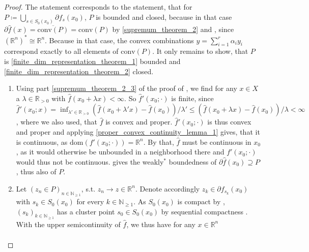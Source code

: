 \documentclass[10pt, leqno]{amsart}
\theoremstyle{definition}
\theoremstyle{remark}
\newcommand{\draftcommentdone}{}
\begin{document}
    \begin{proof}
        The statement corresponds to the statement, that for \(P \coloneqq \bigcup_{s \in S_0(x_0)} \partial f_s(x_0)\), \(P\) is bounded and closed, because in that case \(\partial \hat{f}(x) = \overline{\text{conv}(P)} = \text{conv}(P)\) by  \ref{supremum_theorem_2} and , since \((\mathbb{R}^n)^* \cong \mathbb{R}^n\). Because in that case, the convex combinations \(y = \sum_{i=1}^r \alpha_i y_i\) correspond exactly to all elements of \(\text{conv}(P)\). It only remains to show, that \(P\) is \ref{finite_dim_representation_theorem_1} bounded and \ref{finite_dim_representation_theorem_2} closed.

        \begin{enumerate}[label=(\alph*), wide]
            \item \label{finite_dim_representation_theorem_1} \draftcommentdone Using part \ref{supremum_theorem_2_3} of the proof of , we find for any \(x \in X\) a \(\lambda \in \mathbb{R}_{> 0}\) with \(\hat{f}(x_0 + \lambda x) < \infty\). So \(\hat{f}'(x_0; \cdot)\) is finite, since \(\hat{f}'(x_0; x) = \inf_{\lambda' \in \mathbb{R}_{>0}} (\hat{f}(x_0+\lambda' x)-\hat{f}(x_0))/\lambda' \leq (\hat{f}(x_0+\lambda x)-\hat{f}(x_0))/\lambda < \infty\), where we also used, that \(\hat{f}\) is convex and proper. \(\hat{f}'(x_0; \cdot)\) is thus convex and proper and applying  \ref{proper_convex_continuity_lemma_1} gives, that it is continuous, as \(\text{dom}(f'(x_0; \cdot)) = \mathbb{R}^n\). By that, \(\hat{f}\) must be continuous in \(x_0\), as it would otherwise be unbounded in a neighborhood there and \(f'(x_0; \cdot)\) would thus not be continuous.  gives the weakly\({}^*\) boundedness of \(\partial \hat{f}(x_0) \supseteq P\), thus also of \(P\).
            \item \label{finite_dim_representation_theorem_2} \draftcommentdone Let \((z_n \in P)_{n \in \mathbb{N}_{\geq 1}}\), s.t. \(z_n \to z \in \mathbb{R}^n\). Denote accordingly \(z_k \in \partial f_{s_k}(x_0)\) with \(s_k \in S_0(x_0)\) for every \(k \in \mathbb{N}_{\geq 1}\). As \(S_0(x_0)\) is compact by , \((s_k)_{k \in \mathbb{N}_{\geq 1}}\) has a cluster point \(s_0 \in S_0(x_0)\) by sequential compactness \cite[pp. 179-180]{Munkres}. With the upper semicontinuity of \(\hat{f}\), we thus have for any \(x \in \mathbb{R}^n\)
            \begin{align}

\end{align}
\end{enumerate}
\end{proof}
\end{document}
